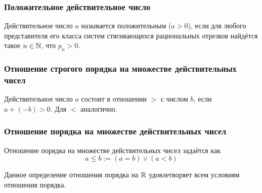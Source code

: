 \subsubsection*{Положительное действительное число}

\begin{definition}
    Действительное число $a$ называется положительным ($a > 0$), если для любого представителя его класса систем стягивающихся рациональных отрезков найдётся такое $n \in \mathbb{N}$, что $p_n > 0$.
\end{definition}

\subsubsection*{Отношение строгого порядка на множестве действительных чисел}

\begin{definition}
    Действительное число $a$ состоит в отношении $>$ с числом $b$, если $a + (-b) > 0$. Для $<$ аналогично.
\end{definition}

\subsubsection*{Отношение порядка на множестве действительных чисел}

\begin{definition}
    Отношение порядка на множестве действительных чисел задаётся как
    $$
        a \le b := (a = b) \vee (a < b)
    $$
\end{definition}

\begin{proposition}
    Данное определение отношения порядка на $\mathbb{R}$ удовлетворяет всем условиям отношения порядка.
\end{proposition}

